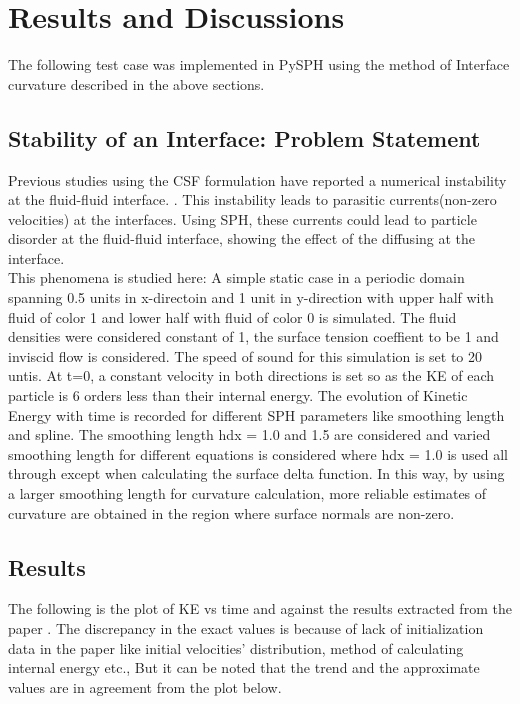 \chapter{Results and Discussions}
The following test case was implemented in PySPH using the method of Interface curvature described in the above sections. \\


\section{Stability of an Interface: Problem Statement}

Previous studies using the CSF formulation have reported a numerical instability at the fluid-fluid interface. \cite{rudman, Surface}. This instability leads to parasitic currents(non-zero velocities) at the interfaces. Using SPH, these currents could lead to particle disorder at the fluid-fluid interface, showing the effect of the diffusing at the interface. \\

This phenomena is studied here: A simple static case in a periodic domain spanning 0.5 units in x-directoin and 1 unit in y-direction with upper half with fluid of color 1 and lower half with fluid of color 0 is simulated. The fluid densities were considered constant of 1, the surface tension coeffient to be 1 and inviscid flow is considered. The speed of sound for this simulation is set to 20 untis.\cite{Morris} At t=0, a constant velocity in both directions is set so as the KE of each particle is 6 orders less than their internal energy.  The evolution of Kinetic Energy with time is recorded for different SPH parameters like smoothing length and spline. The smoothing length hdx = 1.0 and 1.5 are considered and varied smoothing length for different equations is considered where hdx = 1.0 is used all through except when calculating the surface delta function. In this way, by using a larger smoothing length for curvature calculation, more reliable estimates of curvature are obtained in the region where surface normals are non-zero.

\section{Results}

The following is the plot of KE vs time and against the results extracted from the paper \cite{Morris}. The discrepancy in the exact values is because of lack of initialization data in the paper like initial velocities' distribution, method of calculating internal energy etc., But it can be noted that the trend and the approximate values are in agreement from the plot below.

